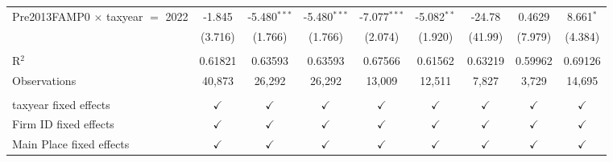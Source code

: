 {\begin{tabular}{lcccccccc}
   Pre2013FAMP0 $\times$ taxyear $=$ 2022  & -1.845        & -5.480$^{***}$ & -5.480$^{***}$ & -7.077$^{***}$ & -5.082$^{**}$  & -24.78        & 0.4629        & 8.661$^{*}$\\   
                                           & (3.716)       & (1.766)        & (1.766)        & (2.074)        & (1.920)        & (41.99)       & (7.979)       & (4.384)\\   
    \\
   R$^2$                                   & 0.61821       & 0.63593        & 0.63593        & 0.67566        & 0.61562        & 0.63219       & 0.59962       & 0.69126\\  
   Observations                            & 40,873        & 26,292         & 26,292         & 13,009         & 12,511         & 7,827         & 3,729         & 14,695\\  
    \\
   taxyear fixed effects                   & $\checkmark$  & $\checkmark$   & $\checkmark$   & $\checkmark$   & $\checkmark$   & $\checkmark$  & $\checkmark$  & $\checkmark$\\   
   Firm ID fixed effects                   & $\checkmark$  & $\checkmark$   & $\checkmark$   & $\checkmark$   & $\checkmark$   & $\checkmark$  & $\checkmark$  & $\checkmark$\\   
   Main Place fixed effects                & $\checkmark$  & $\checkmark$   & $\checkmark$   & $\checkmark$   & $\checkmark$   & $\checkmark$  & $\checkmark$  & $\checkmark$\\   
   \bottomrule
\end{tabular}
}
